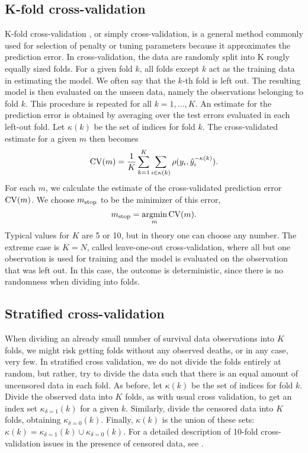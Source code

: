 \subsection{K-fold cross-validation}\label{subsec:K-fold}
K-fold cross-validation \citep{lachenbruch}, or simply cross-validation, is a general method commonly used for selection of penalty or tuning parameters because it approximates the prediction error.
In cross-validation, the data are randomly split into K rougly equally sized folds.
For a given fold $k$, all folds except $k$ act as the training data in estimating the model.
We often say that the $k$-th fold is left out.
The resulting model is then evaluated on the unseen data, namely the observations belonging to fold $k$.
This procedure is repeated for all $k=1,\ldots,K$.
An estimate for the prediction error is obtained by averaging over the test errors evaluated in each left-out fold. Let $\kappa(k)$ be the set of indices for fold $k$.
The cross-validated estimate for a given $m$ then becomes
\begin{equation*}
    \operatorname{CV}(m)=\frac{1}{K}\sum_{k=1}^K\sum_{i\in\kappa(k)}\rho(y_i,\hat{y}_i^{-\kappa(k)}).
\end{equation*}
For each $m$, we calculate the estimate of the cross-validated prediction error $\operatorname{CV}(m)$.
We choose $m_{\text{stop}}$ to be the minimizer of this error,
\begin{equation*}
    m_{\text{stop}}=\operatorname*{argmin}_{m}\operatorname{CV}(m).
\end{equation*}
Typical values for $K$ are 5 or 10, but in theory one can choose any number. The extreme case is $K=N$, called leave-one-out cross-validation, where all but one observation is used for training and the model is evaluated on the observation that was left out. In this case, the outcome is deterministic, since there is no randomness when dividing into folds.

\subsection{Stratified cross-validation}
When dividing an already small number of survival data observations into $K$ folds, we might risk getting folds without any observed deaths, or in any case, very few. In stratified cross validation, we do not divide the folds entirely at random, but rather, try to divide the data such that there is an equal amount of uncensored data in each fold.
As before, let $\kappa(k)$ be the set of indices for fold $k$.
Divide the observed data into $K$ folds, as with usual cross validation, to get an index set $\kappa_{\delta=1}(k)$ for a given $k$. 
Similarly, divide the censored data into $K$ folds, obtaining $\kappa_{\delta=0}(k)$.
Finally, $\kappa(k)$ is the union of these sets: $\kappa(k)=\kappa_{\delta=1}(k)\cup\kappa_{\delta=0}(k)$.
For a detailed description of 10-fold cross-validation issues in the presence of censored data, see \citet{kohavi}.

